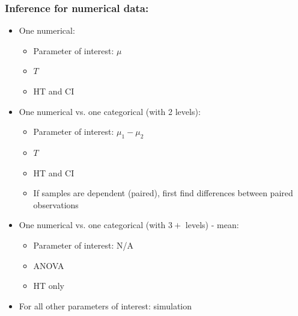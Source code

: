 \documentclass[11pt,containsverbatim,handout,xcolor=xelatex,dvipsnames,table]{beamer}
\begin{document}
\begin{frame}
\frametitle{Inference for numerical data:}

\pause

\begin{itemize}

\item One numerical: \\
\begin{itemize}
\item Parameter of interest: $\mu$
\item $T$
\item HT and CI
\end{itemize}

\pause

\item One numerical vs. one categorical (with 2 levels):
\begin{itemize}
\item Parameter of interest: $\mu_1 - \mu_2$
\item $T$
\item HT and CI
\pause
\item If samples are dependent (paired), first find differences between paired observations
\end{itemize}

\pause

\item One numerical vs. one categorical (with $3+$ levels) - mean: \\
\begin{itemize}
\item Parameter of interest: N/A
\item ANOVA
\item HT only
\end{itemize}

\pause

\item For all other parameters of interest: simulation

\end{itemize}

\end{frame}

\end{document}
